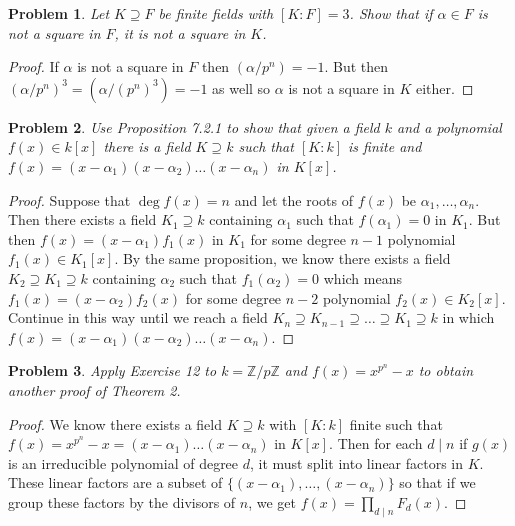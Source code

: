 \documentclass{article}
\newtheorem{problem}{Problem}
\begin{document}
\begin{problem}
Let $K \supseteq F$ be finite fields with $[K:F] = 3$. Show that if $\alpha \in F$ is not a square in $F$, it is not a square in $K$.
\end{problem}
\begin{proof}
If $\alpha$ is not a square in $F$ then $(\alpha/p^n) = -1$. But then $(\alpha/p^n)^3 = (\alpha/(p^n)^3) = -1$ as well so $\alpha$ is not a square in $K$ either.
\end{proof}

\begin{problem}
Use Proposition 7.2.1 to show that given a field $k$ and a polynomial $f(x) \in k[x]$ there is a field $K \supseteq k$ such that $[K:k]$ is finite and $f(x) = (x-\alpha_1)(x-\alpha_2) \dots (x-\alpha_n)$ in $K[x]$.
\end{problem}
\begin{proof}
Suppose that $\deg f(x) = n$ and let the roots of $f(x)$ be $\alpha_1, \dots , \alpha_n$. Then there exists a field $K_1 \supseteq k$ containing $\alpha_1$ such that $f(\alpha_1) = 0$ in $K_1$. But then $f(x) = (x-\alpha_1)f_1(x)$ in $K_1$ for some degree $n-1$ polynomial $f_1(x) \in K_1[x]$. By the same proposition, we know there exists a field $K_2 \supseteq K_1 \supseteq k$ containing $\alpha_2$ such that $f_1(\alpha_2) = 0$ which means $f_1(x) = (x-\alpha_2)f_2(x)$ for some degree $n-2$ polynomial $f_2(x) \in K_2[x]$. Continue in this way until we reach a field $K_n \supseteq K_{n-1} \supseteq \dots \supseteq K_1 \supseteq k$ in which $f(x) = (x-\alpha_1)(x-\alpha_2) \dots (x-\alpha_n)$.
\end{proof}

\begin{problem}
Apply Exercise 12 to $k = \mathbb{Z}/p\mathbb{Z}$ and $f(x) = x^{p^n} - x$ to obtain another proof of Theorem 2.
\end{problem}
\begin{proof}
We know there exists a field $K \supseteq k$ with $[K:k]$ finite such that $f(x) = x^{p^n}-x = (x-\alpha_1) \dots (x-\alpha_n)$ in $K[x]$. Then for each $d \mid n$ if $g(x)$ is an irreducible polynomial of degree $d$, it must split into linear factors in $K$. These linear factors are a subset of $\{(x-\alpha_1), \dots , (x-\alpha_n)\}$ so that if we group these factors by the divisors of $n$, we get $f(x) = \prod_{d \mid n} F_d(x)$.
\end{proof}
\end{document}
